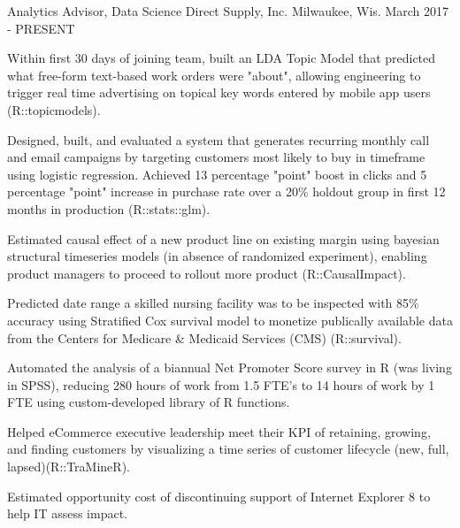 

\begin{cventries}

  \cventry
    {Analytics Advisor, Data Science} %
    {Direct Supply, Inc.} %
    {Milwaukee, Wis.} %
    {March 2017 - PRESENT} %
    {
      \begin{cvitems} %
        \item {Within first 30 days of joining team, built an LDA Topic Model that predicted what free-form text-based work orders were "about", allowing engineering to trigger real time advertising on topical key words entered by mobile app users (R::topicmodels).}
        \item {Designed, built, and evaluated a system that generates recurring monthly call and email campaigns by targeting customers most likely to buy in timeframe using logistic regression. Achieved 13 percentage "point" boost in clicks and 5 percentage "point" increase in purchase rate over a 20\% holdout group in first 12 months in production (R::stats::glm).}
        \item {Estimated causal effect of a new product line on existing margin using bayesian structural timeseries models (in absence of randomized experiment), enabling product managers to proceed to rollout more product (R::CausalImpact).}
        \item {Predicted date range a skilled nursing facility was to be inspected with 85\% accuracy using Stratified Cox survival model to monetize publically available data from the Centers for Medicare \& Medicaid Services (CMS) (R::survival).}
        \item {Automated the analysis of a biannual Net Promoter Score survey in R (was living in SPSS), reducing 280 hours of work from 1.5 FTE’s to 14 hours of work by 1 FTE using custom-developed library of R functions.}
        \item {Helped eCommerce executive leadership meet their KPI of retaining, growing, and finding customers by visualizing a time series of customer lifecycle (new, full, lapsed)(R::TraMineR).}
        \item {Estimated opportunity cost of discontinuing support of Internet Explorer 8 to help IT assess impact.}
      \end{cvitems}
    }


\end{cventries}
